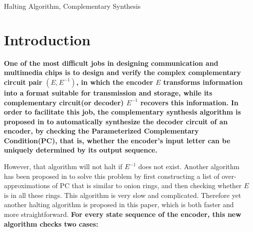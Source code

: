 \documentclass[journal]{IEEEtran}
\begin{document}
\begin{IEEEkeywords}
Halting Algorithm, Complementary Synthesis
\end{IEEEkeywords}






%
\IEEEpeerreviewmaketitle


\newtheorem{algo}{\textbf{Algorithm}}
\newtheorem{definition11}{\textbf{Definition}}
\newtheorem{lemma}{\textbf{Lemma}}
\newtheorem{theorem}{\textbf{Theorem}}
\newtheorem{proposition}{\textbf{Proposition}}

\section{Introduction}\label{sec_intro}
\textbf{One of the most difficult jobs in designing communication and multimedia chips
is to design and verify the complex complementary circuit pair $(E,E^{-1})$,
in which the encoder $E$ transforms information into a format suitable for transmission and storage,
while its complementary circuit(or decoder) $E^{-1}$ recovers this information.
In order to facilitate this job,
the complementary synthesis algorithm is proposed in \cite{ShengYuShen:iccad09,ShengYuShen:tcad}
to automatically synthesize the decoder circuit of an encoder,
by checking the Parameterized Complementary Condition(PC),
that is,
whether the encoder's input letter can be uniquely determined by its output sequence.}

However,
that algorithm will not halt if $E^{-1}$ does not exist.
Another algorithm has been proposed in \cite{ShengYuShen:fmcad10} to solve this problem
by first constructing a list of over-approximations of PC that is similar to onion rings,
and then checking whether $E$ is in all these rings.
This algorithm is very slow and complicated.
Therefore yet another halting algorithm is proposed in this paper,
which is both faster and more straightforward.
\textbf{For every state sequence of the encoder,
this new algorithm checks two cases:}
\end{document}
